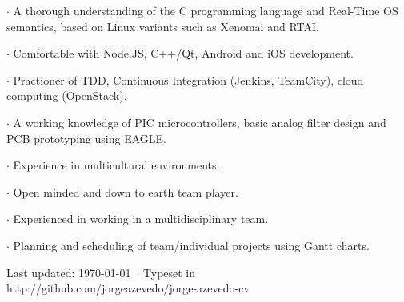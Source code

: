 {
 $\cdot$ A thorough understanding of the C programming language and Real-Time OS
semantics, based on Linux variants such as Xenomai and RTAI.

 $\cdot$ Comfortable with Node.JS, C++/Qt, Android and iOS development.

 $\cdot$ Practioner of TDD, Continuous Integration (Jenkins, TeamCity), cloud
computing (OpenStack).
}
{
 $\cdot$ A working knowledge of PIC microcontrollers, basic analog filter design and PCB
prototyping using EAGLE.
}
{
 $\cdot$ Experience in multicultural environments. 

 $\cdot$ Open minded and down to earth team player.

}
{

 $\cdot$ Experienced in working in a multidisciplinary team.

 $\cdot$ Planning and scheduling of team/individual projects using Gantt charts.
}


\vfill

\begin{center}
{
    \scriptsize  Last updated: \today ~$\cdot$ Typeset in \XeLaTeX\\
    http://github.com/jorgeazevedo/jorge-azevedo-cv
}

\end{center}

